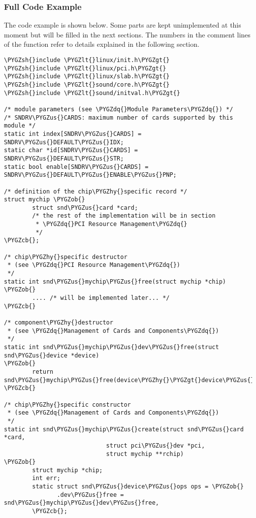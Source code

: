 \documentclass[a4paper,8pt,english]{sphinxmanual}
\def\PYGZus{\char`\_}
\def\PYGZob{\char`\{}
\def\PYGZcb{\char`\}}
\def\PYGZlt{\char`\<}
\def\PYGZgt{\char`\>}
\def\PYGZsh{\char`\#}
\def\PYGZhy{\char`\-}
\def\PYGZdq{\char`\"}
\begin{document}
\subsubsection{Full Code Example}
\label{sound/kernel-api/writing-an-alsa-driver:full-code-example}
The code example is shown below. Some parts are kept unimplemented at
this moment but will be filled in the next sections. The numbers in the
comment lines of the  function refer
to details explained in the following section.

\begin{Verbatim}[commandchars=\\\{\}]
\PYGZsh{}include \PYGZlt{}linux/init.h\PYGZgt{}
\PYGZsh{}include \PYGZlt{}linux/pci.h\PYGZgt{}
\PYGZsh{}include \PYGZlt{}linux/slab.h\PYGZgt{}
\PYGZsh{}include \PYGZlt{}sound/core.h\PYGZgt{}
\PYGZsh{}include \PYGZlt{}sound/initval.h\PYGZgt{}

/* module parameters (see \PYGZdq{}Module Parameters\PYGZdq{}) */
/* SNDRV\PYGZus{}CARDS: maximum number of cards supported by this module */
static int index[SNDRV\PYGZus{}CARDS] = SNDRV\PYGZus{}DEFAULT\PYGZus{}IDX;
static char *id[SNDRV\PYGZus{}CARDS] = SNDRV\PYGZus{}DEFAULT\PYGZus{}STR;
static bool enable[SNDRV\PYGZus{}CARDS] = SNDRV\PYGZus{}DEFAULT\PYGZus{}ENABLE\PYGZus{}PNP;

/* definition of the chip\PYGZhy{}specific record */
struct mychip \PYGZob{}
        struct snd\PYGZus{}card *card;
        /* the rest of the implementation will be in section
         * \PYGZdq{}PCI Resource Management\PYGZdq{}
         */
\PYGZcb{};

/* chip\PYGZhy{}specific destructor
 * (see \PYGZdq{}PCI Resource Management\PYGZdq{})
 */
static int snd\PYGZus{}mychip\PYGZus{}free(struct mychip *chip)
\PYGZob{}
        .... /* will be implemented later... */
\PYGZcb{}

/* component\PYGZhy{}destructor
 * (see \PYGZdq{}Management of Cards and Components\PYGZdq{})
 */
static int snd\PYGZus{}mychip\PYGZus{}dev\PYGZus{}free(struct snd\PYGZus{}device *device)
\PYGZob{}
        return snd\PYGZus{}mychip\PYGZus{}free(device\PYGZhy{}\PYGZgt{}device\PYGZus{}data);
\PYGZcb{}

/* chip\PYGZhy{}specific constructor
 * (see \PYGZdq{}Management of Cards and Components\PYGZdq{})
 */
static int snd\PYGZus{}mychip\PYGZus{}create(struct snd\PYGZus{}card *card,
                             struct pci\PYGZus{}dev *pci,
                             struct mychip **rchip)
\PYGZob{}
        struct mychip *chip;
        int err;
        static struct snd\PYGZus{}device\PYGZus{}ops ops = \PYGZob{}
               .dev\PYGZus{}free = snd\PYGZus{}mychip\PYGZus{}dev\PYGZus{}free,
        \PYGZcb{};


\end{Verbatim}
\end{document}
